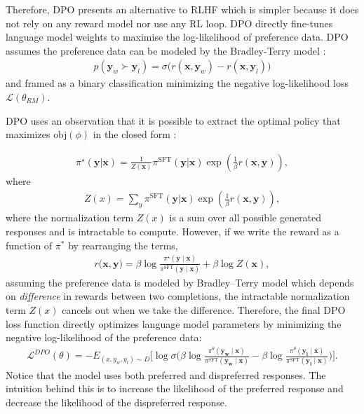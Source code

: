 Therefore, DPO \citep{rafailov2024direct} presents an alternative to RLHF which is simpler because it does not rely on any reward model nor use any RL loop. DPO directly fine-tunes language model weights to maximise the log-likelihood of preference data. DPO assumes the preference data can be modeled by the Bradley-Terry model \citep{bradley1952rank}: 
\begin{align}
p(\boldsymbol{y}_w \succ \boldsymbol{y}_l) = \sigma \big(r(\boldsymbol{x}, \boldsymbol{y}_w) - r(\boldsymbol{x}, \boldsymbol{y}_l) \big)
\end{align}
and framed as a binary classification minimizing the negative log-likelihood loss $\mathcal{L}(\theta_{RM})$.

DPO uses an observation that it is possible to extract the optimal policy that maximizes $\text{obj}(\phi)$ in the closed form \citep{peng2019advantage}:

\begin{align}
\pi^{\star} (\boldsymbol{y}|\boldsymbol{x})= \frac{1}{Z(\boldsymbol{x})} \pi^{\text{SFT}}(\boldsymbol{y}|\boldsymbol{x}) \exp\left(\frac{1}{\beta} r(\boldsymbol{x},\boldsymbol{y})\right),
\end{align}
where
\begin{align}
Z(x) = \sum_{y} \pi^{\text{SFT}}(\boldsymbol{y}|\boldsymbol{x}) \exp\left(\frac{1}{\beta} r(\boldsymbol{x},\boldsymbol{y})\right),
\end{align}
where the normalization term $Z(x)$ is a sum over all possible generated responses and is intractable to compute. However, if we write the reward as a function of $\pi^{*}$ by rearranging the terms,
\begin{align}
r\big(\boldsymbol{x}, \boldsymbol{y}) = \beta \log \frac{\pi^{\star} (\boldsymbol{y} \mid \boldsymbol{x})}{\pi^{\text{SFT}} (\boldsymbol{y} \mid \boldsymbol{x})} + \beta \log Z(\boldsymbol{x}),
\end{align}
assuming the preference data is modeled by Bradley--Terry model which depends on \textit{difference} in rewards between two completions, the intractable normalization term  $Z(x)$ cancels out when we take the difference. Therefore, the final DPO loss function directly optimizes language model parameters by minimizing the negative log-likelihood of the preference data:
\begin{align}
\mathcal{L}^{DPO}(\theta) = - E_{(x,y_w,y_l) \sim D} \big[ \log \sigma \big(\beta \log \frac{\pi^{\theta} (\boldsymbol{y_w} \mid \boldsymbol{x})}{\pi^{\text{SFT}} (\boldsymbol{y_w} \mid \boldsymbol{x})} - \beta \log \frac{\pi^{\theta} (\boldsymbol{y_l} \mid \boldsymbol{x})}{\pi^{\text{SFT}} (\boldsymbol{y_l} \mid \boldsymbol{x})}\big)  \big].
\end{align}
Notice that the model uses both preferred and dispreferred responses. The intuition behind this is to increase the likelihood of the preferred response and decrease the likelihood of the dispreferred response.


